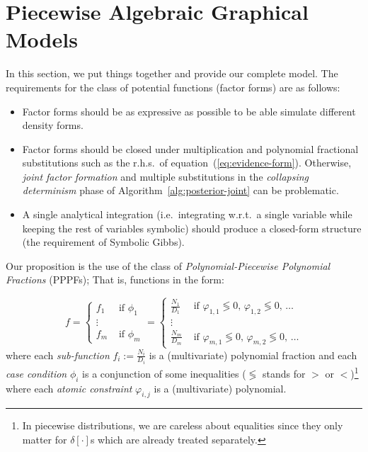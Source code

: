 \documentclass[letterpaper]{article}
\newcommand{\case}[2]{#2 &\text{ if } #1}%
\begin{document}
\section{Piecewise Algebraic Graphical Models}
In this section, we put things together and provide our complete model.
The requirements for the class of potential functions (factor forms) are as follows:
\begin{itemize}
\item Factor forms should be as expressive as possible to be able simulate different density forms.  
\item Factor forms should be closed under multiplication and polynomial fractional substitutions such as 
the r.h.s.\ of equation~(\ref{eq:evidence-form}). Otherwise, \emph{joint factor formation} and multiple substitutions in the \emph{collapsing determinism} phase of 
Algorithm~\ref{alg:posterior-joint} can be problematic.
\item A single analytical integration 
(i.e.\ integrating w.r.t.\ a single variable while keeping the rest of variables symbolic) should produce a closed-form structure (the requirement of Symbolic Gibbs).
\end{itemize}   

Our proposition is the use of 
the class of \emph{Polynomial-Piecewise Polynomial Fractions} (PPPFs); That is,   
functions in the form:

\begin{equation}
\label{e:ppf}
f = 
  \begin{cases}
  \case{\phi_1}{f_1}\\
\vdots\\
  \case{\phi_m}{f_m}    
  \end{cases}
\!\!\!=
  \begin{cases}
  \case{\varphi_{1,1} \lessgtr 0,\, \varphi_{1,2} \lessgtr 0,\, \ldots}{\frac{N_1}{D_1}} \\
\vdots\\
   \case{\varphi_{m,1} \lessgtr 0,\, \varphi_{m,2} \lessgtr 0,\, \ldots}{\frac{N_m}{D_m}}    
  \end{cases}
\end{equation}
where each \emph{sub-function} $f_i := \frac{N_i}{D_i}$ is a (multivariate) polynomial fraction and 
each \emph{case condition} $\phi_i$ is a conjunction of some inequalities ($\lessgtr$ stands for  
$>$ or $<$)\footnote{In piecewise distributions,  
we are careless about equalities since they only matter for $\delta[\cdot]$s which are already treated separately.} 
where each \emph{atomic constraint} $\varphi_{i,j}$ is a (multivariate) polynomial.
\end{document}
